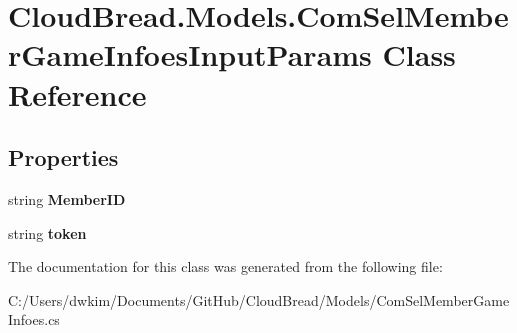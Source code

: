 \hypertarget{a00058}{}\section{Cloud\+Bread.\+Models.\+Com\+Sel\+Member\+Game\+Infoes\+Input\+Params Class Reference}
\label{a00058}
\subsection*{Properties}
\begin{DoxyCompactItemize}
\item 
string {\bfseries Member\+ID}\hypertarget{a00058_a9d4bf4f11c41460246c2d359ef8101e5}{}\label{a00058_a9d4bf4f11c41460246c2d359ef8101e5}

\item 
string {\bfseries token}\hypertarget{a00058_acf1b5e6f724f126b892a6415c5fb8059}{}\label{a00058_acf1b5e6f724f126b892a6415c5fb8059}

\end{DoxyCompactItemize}


The documentation for this class was generated from the following file\+:\begin{DoxyCompactItemize}
\item 
C\+:/\+Users/dwkim/\+Documents/\+Git\+Hub/\+Cloud\+Bread/\+Models/Com\+Sel\+Member\+Game\+Infoes.\+cs\end{DoxyCompactItemize}
